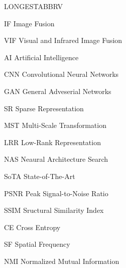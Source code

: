 \begin{theglossary}{LONGESTABBRV}

    \item[IF] Image Fusion
    \item[VIF] Visual and Infrared Image Fusion 
    \item[AI] Artificial Intelligence
    \item[CNN] Convolutional Neural Networks
    \item[GAN] General Adveserial Networks   
    \item[SR] Sparse Representation
    \item[MST] Multi-Scale Transformation
    \item[LRR] Low-Rank Representation
    \item[NAS] Neaural Architecture Search
    \item[SoTA] State-of-The-Art
    \item[PSNR] Peak Signal-to-Noise Ratio
    \item[SSIM] Sructural Similarity Index
    \item[CE] Cross Entropy
    \item[SF] Spatial Frequency
    \item[NMI] Normalized Mutual Information

\end{theglossary}
